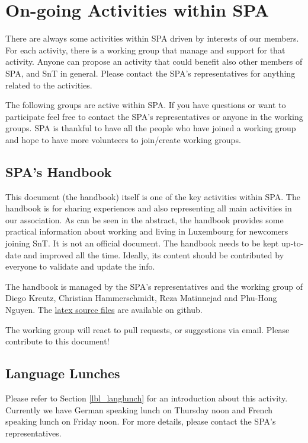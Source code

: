 \section{On-going Activities within SPA} \label{sec_activities}
There are always some activities within SPA driven by interests of our members. 
For each activity, there is a working group that manage and support for that activity. 
Anyone can propose an activity that could benefit also other members of SPA, and SnT in general. 
Please contact the SPA's representatives for anything related to the activities. 

The following groups are active within SPA. If you have questions or want to participate feel free to contact the SPA's representatives or anyone in the working groups. 
SPA is thankful to have all the people who have joined a working group and hope to have more volunteers to join/create working groups. 

\subsection{SPA's Handbook}

This document (the handbook) itself is one of the key activities within SPA. 
The handbook is for sharing experiences and also representing all main activities in our association. 
As can be seen in the abstract, the handbook provides some practical information about working and living in Luxembourg for newcomers joining SnT. 
It is not an official document. 
The handbook needs to be kept up-to-date and improved all the time. 
Ideally, its content should be contributed by everyone to validate and update the info. 

The handbook is managed by the SPA's representatives and the working group of Diego Kreutz, Christian Hammerschmidt, Reza Matinnejad and Phu-Hong Nguyen. 
The \href{https://github.com/SPAlux/handbook}{latex source files} are available on github. 


The working group will react to pull requests, or suggestions via email. 
Please contribute to this document!
 
\subsection{Language Lunches}
Please refer to Section \ref{lbl_langlunch} for an introduction about this activity. 
Currently we have German speaking lunch on Thursday noon and French speaking lunch on Friday noon. 
For more details, please contact the SPA's representatives. 
 
